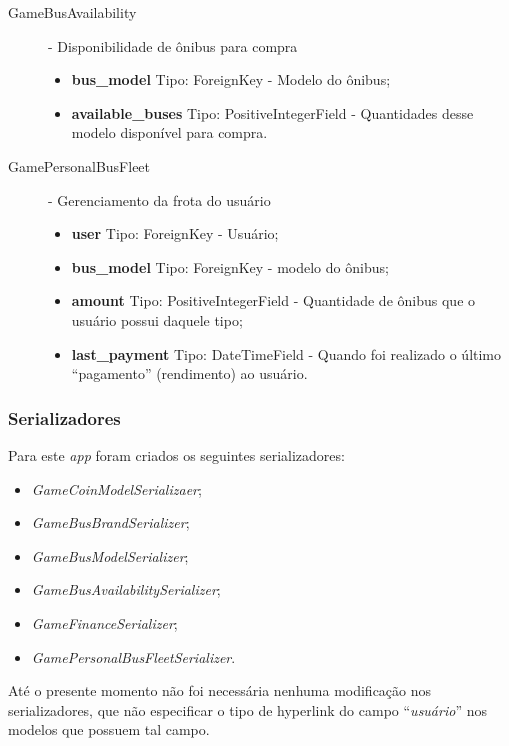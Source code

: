 \begin{description}
\begin{itemize}
        \end{itemize}
    \item[GameBusAvailability] - Disponibilidade de ônibus para compra
        \begin{itemize}
            \item \textbf{bus\_model} Tipo: ForeignKey - Modelo do ônibus;
            \item \textbf{available\_buses} Tipo: PositiveIntegerField - Quantidades desse modelo disponível para compra.
        \end{itemize}
    \item[GamePersonalBusFleet] - Gerenciamento da frota do usuário
        \begin{itemize}
            \item \textbf{user} Tipo: ForeignKey - Usuário;
            \item \textbf{bus\_model} Tipo: ForeignKey - modelo do ônibus;
            \item \textbf{amount} Tipo: PositiveIntegerField - Quantidade de ônibus que o usuário possui daquele tipo;
            \item \textbf{last\_payment} Tipo: DateTimeField - Quando foi realizado o último ``pagamento'' (rendimento) ao usuário.
        \end{itemize}
\end{description}

\subsubsection{Serializadores}
Para este \textit{app} foram criados os seguintes serializadores: %
\begin{itemize}
    \item \textit{GameCoinModelSerializaer};
    \item \textit{GameBusBrandSerializer};
    \item \textit{GameBusModelSerializer};
    \item \textit{GameBusAvailabilitySerializer};
    \item \textit{GameFinanceSerializer};
    \item \textit{GamePersonalBusFleetSerializer}.
\end{itemize}
Até o presente momento não foi necessária nenhuma modificação nos serializadores, que não especificar o tipo de hyperlink do campo ``\textit{usuário}'' nos modelos que possuem tal campo.

